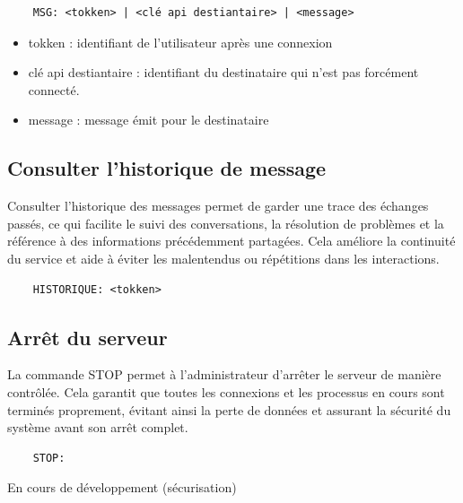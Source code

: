 \documentclass{report}
\begin{document}
\begin{verbatim}
	MSG: <tokken> | <clé api destiantaire> | <message>
\end{verbatim}

\begin{itemize}
	\item tokken : identifiant de l'utilisateur après une connexion
	\item clé api destiantaire : identifiant du destinataire qui n'est pas forcément connecté.
	\item message : message émit pour le destinataire
\end{itemize}

\subsection{Consulter l’historique de message}

Consulter l’historique des messages permet de garder une trace des échanges passés, ce qui facilite le suivi des conversations, la résolution de problèmes et la référence à des informations précédemment partagées. Cela améliore la continuité du service et aide à éviter les malentendus ou répétitions dans les interactions.

\begin{verbatim}
	HISTORIQUE: <tokken>
\end{verbatim}

\subsection{Arrêt du serveur}

La commande STOP permet à l'administrateur d'arrêter le serveur de manière contrôlée. Cela garantit que toutes les connexions et les processus en cours sont terminés proprement, évitant ainsi la perte de données et assurant la sécurité du système avant son arrêt complet.

\begin{verbatim}
	STOP:
\end{verbatim}

En cours de développement (sécurisation)
\end{document}
